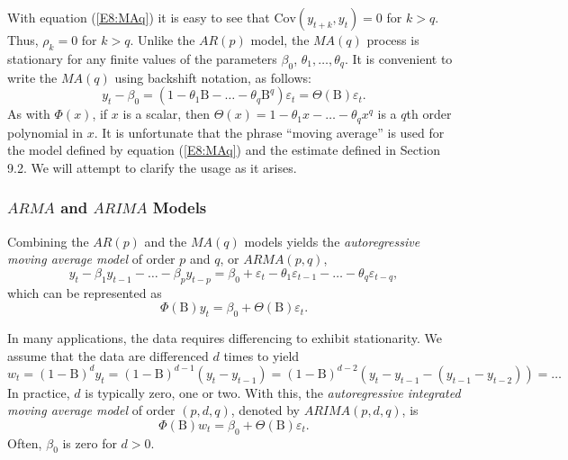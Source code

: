 With equation (\ref{E8:MAq}) it is easy to see that $\mathrm{Cov}
(y_{t+k},y_t)=0$ for $k>q$. Thus, $\rho_k =0$ for $k>q$. Unlike the
$AR(p)$ model, the $MA(q)$ process is stationary for any finite
values of the parameters $\beta_0$, $\theta_1, \ldots, \theta_q$. It
is convenient to write the $MA(q)$ using backshift notation, as
follows:
\begin{equation*}
y_t - \beta_0 = \left( 1-\theta_1\mathrm{B} - \ldots - \theta_q
\mathrm{B}^q\right) \varepsilon_t = \Theta \left( \mathrm{B}\right)
\varepsilon_t.
\end{equation*}
As with $\Phi \left( x\right) $, if $x$ is a scalar, then $\Theta
\left( x\right) = 1 - \theta_1 x - \ldots - \theta_q x^q$ is a $q$th
order polynomial in $x$. It is unfortunate that the phrase ``moving
average'' is used for the model defined by equation (\ref{E8:MAq})
and the estimate defined in Section 9.2. We will attempt to clarify
the usage as it arises.

\subsubsection*{$ARMA$ and $ARIMA$ Models}

Combining the $AR(p)$ and the $MA(q)$ models yields the
\emph{autoregressive moving average model} of order $p$ and $q$, or
$ARMA(p,q)$,
\begin{equation}\label{E8:ARMApq}
y_t - \beta_1 y_{t-1} - \ldots - \beta_p y_{t-p} = \beta_0 +
\varepsilon _t - \theta_1 \varepsilon_{t-1} - \ldots - \theta_q
\varepsilon_{t-q},
\end{equation}
which can be represented as
\begin{equation}
\Phi \left( \mathrm{B}\right) y_t = \beta_0 + \Theta \left(
\mathrm{B} \right) \varepsilon_t.
\end{equation}

In many applications, the data requires differencing to exhibit
stationarity. We assume that the data are differenced $d$ times to
yield
\begin{equation}\label{E8:Diffd}
w_t = \left( 1-\mathrm{B}\right)^d y_t = \left( 1-\mathrm{B}\right)
^{d-1}\left( y_t-y_{t-1}\right) = \left( 1-\mathrm{B}\right)
^{d-2}\left( y_t-y_{t-1}-\left( y_{t-1}-y_{t-2}\right) \right) =
\ldots
\end{equation}
In practice, $d$ is typically zero, one or two. With this, the
\emph{autoregressive integrated moving average model} of order
$(p,d,q)$, denoted by $ARIMA(p,d,q)$, is
\begin{equation}
\Phi \left( \mathrm{B}\right) w_t = \beta_0+\Theta \left( \mathrm{B}
\right) \varepsilon_t.
\end{equation}
Often, $\beta_0$ is zero for $d>0$.

